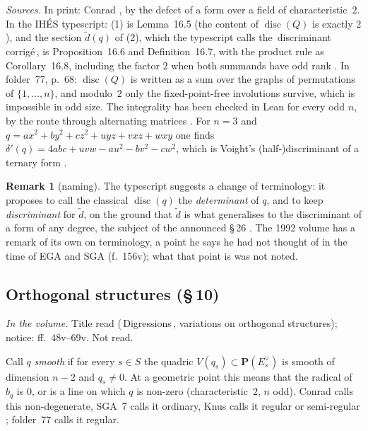 \documentclass[11pt,a4paper]{amsart}
\newcommand{\q}[1]{\guillemotleft\,#1\,\guillemotright}
\newcommand{\Pj}{\mathbf{P}}
\newcommand{\disc}{\operatorname{disc}}
\newcommand{\status}[1]{\par\smallskip\noindent\textit{In the volume.} #1\par\smallskip}
\theoremstyle{plain}
\theoremstyle{definition}
\newtheorem{remark}[theorem]{Remark}
\begin{document}
\noindent\emph{Sources.} In print: Conrad \cite[Prop.~C.1.4]{conrad}, by the defect of a form over a field of characteristic~$2$. In the IHÉS typescript: (1) is Lemma~16.5 (the content of $\disc(Q)$ is exactly $2$), and the section $\tilde d(q)$ of (2), which the typescript calls the \q{discriminant corrigé}, is Proposition~16.6 and Definition~16.7, with the product rule as Corollary~16.8, including the factor $2$ when both summands have odd rank \cite{ihes}. In folder~77, p.~68: $\disc(Q)$ is written as a sum over the graphs of permutations of $\{1,\dots,n\}$, and modulo~$2$ only the fixed-point-free involutions survive, which is impossible in odd size. The integrality has been checked in Lean for every odd $n$, by the route through alternating matrices \cite{hua2611}. For $n=3$ and $q=ax^2+by^2+cz^2+uyz+vxz+wxy$ one finds $\delta'(q)=4abc+uvw-au^2-bv^2-cw^2$, which is Voight's (half-)discriminant of a ternary form \cite[(3.2)]{voight2011}.

\begin{remark}[naming]\label{rem:naming}
The typescript suggests a change of terminology: it proposes to call the classical $\disc(q)$ the \emph{determinant} of $q$, and to keep \emph{discriminant} for $\tilde d$, on the ground that $\tilde d$ is what generalises to the discriminant of a form of any degree, the subject of the announced \S\,26 \cite{ihes}. The 1992 volume has a remark of its own on terminology, a point he says he had not thought of in the time of EGA and SGA (f.~156v); what that point is was not noted.
\end{remark}

\subsection{Orthogonal structures (\S\,10)}\label{sub:orth}
\status{Title read (\q{Digressions}, variations on orthogonal structures); notice: ff.~48v--69v. Not read.}
Call $q$ \emph{smooth} if for every $s\in S$ the quadric $V(q_s)\subset\Pj(E_s^\vee)$ is smooth of dimension $n-2$ and $q_s\neq0$. At a geometric point this means that the radical of $b_q$ is $0$, or is a line on which $q$ is non-zero (characteristic~$2$, $n$ odd). Conrad calls this non-degenerate, SGA~7 calls it ordinary, Knus calls it regular or semi-regular \cite[\S\,C.1 and Rem.~C.1.1]{conrad}; folder~77 calls it regular.
\end{document}

